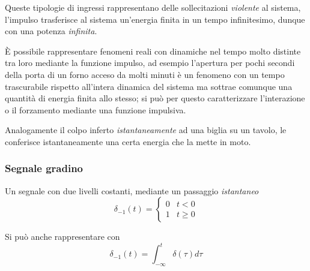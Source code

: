 Queste tipologie di ingressi rappresentano delle sollecitazioni
\textit{violente} al sistema, l'impulso trasferisce al sistema un'energia
finita in un tempo infinitesimo, dunque con una potenza \textit{infinita}.

È possibile rappresentare fenomeni reali con dinamiche nel tempo molto
distinte tra loro mediante la funzione impulso, ad esempio l'apertura per
pochi secondi della porta di un forno acceso da molti minuti è un fenomeno con
un tempo trascurabile rispetto all'intera dinamica del sistema ma sottrae
comunque una quantità di energia finita allo stesso; si può per questo
caratterizzare l'interazione o il forzamento mediante una funzione impulsiva.

Analogamente il colpo inferto \textit{istantaneamente} ad una biglia su un
tavolo, le conferisce istantaneamente una certa energia che la mette in moto.

\subsubsection{Segnale gradino}
Un segnale con due livelli costanti, mediante un passaggio \textit{istantaneo}
$$
\delta_{-1}(t) = \begin{cases}
0 & t<0 \\
1 & t \geq 0
\end{cases}
$$
\begin{figure}[h]
\centering
\end{figure}

Si può anche rappresentare con
$$
\delta_{-1}(t) = \int_{-\infty}^{t} \delta(\tau)d\tau
$$

